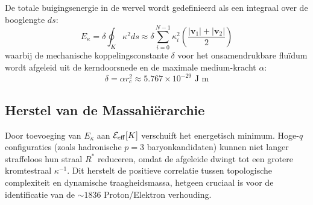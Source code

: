 \documentclass[12pt,a4paper]{article}
\begin{document}
De totale buigingsenergie in de wervel wordt gedefinieerd als een integraal over de booglengte $ds$:
\begin{equation}
    E_{\kappa} = \delta \oint_K \kappa^2 ds \approx \delta \sum_{i=0}^{N-1} \kappa_i^2 \left( \frac{|\mathbf{v}_1| + |\mathbf{v}_2|}{2} \right)
\end{equation}
waarbij de mechanische koppelingsconstante $\delta$ voor het onsamendrukbare flu\"idum wordt afgeleid uit de kerndoorsnede en de maximale medium-kracht $\alpha$:
\begin{equation}
    \delta = \alpha r_c^2 \approx 5.767 \times 10^{-29} \text{ J m}
\end{equation}

\subsection*{Herstel van de Massahi\"erarchie}
Door toevoeging van $E_{\kappa}$ aan $\mathcal{E}_{\rm eff}[K]$ verschuift het energetisch minimum. Hoge-$q$ configuraties (zoals hadronische $p=3$ baryonkandidaten) kunnen niet langer straffeloos hun straal $R^*$ reduceren, omdat de afgeleide dwingt tot een grotere kromtestraal $\kappa^{-1}$. Dit herstelt de positieve correlatie tussen topologische complexiteit en dynamische traagheidsmassa, hetgeen cruciaal is voor de identificatie van de $\sim 1836$ Proton/Elektron verhouding.
\end{document}
